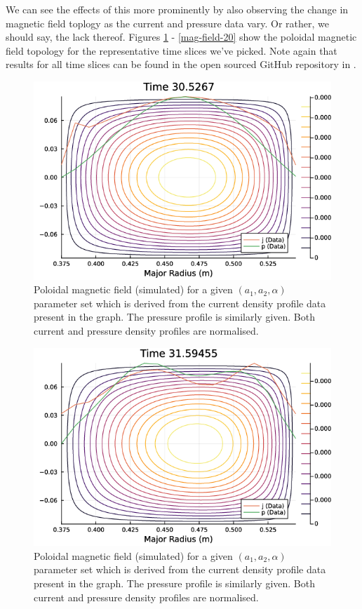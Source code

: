 We can see the effects of this more prominently by also observing the change in magnetic field toplogy 
as the current and pressure data vary. Or rather, we should say, the lack thereof. Figures \ref{mag-field-0} - \ref{mag-field-20}
show the poloidal magnetic field topology for the representative time slices we've picked. Note again that results for all 
time slices can be found in the open sourced GitHub repository in \cite{project-source}.

\begin{figure}[h!]
    \centering
    \includegraphics[scale=0.7]{imgs/c5/magnetic-field-0.png}
    \caption{Poloidal magnetic field (simulated) for a given $(a_1, a_2, \alpha)$ parameter set which is derived 
    from the current density profile data present in the graph. The pressure profile is similarly given. Both current 
    and pressure density profiles are normalised.}
    \label{mag-field-0}
\end{figure}\newpage

\begin{figure}[h!]
    \centering
    \includegraphics[scale=0.55]{imgs/c5/magnetic-field-15.png}
    \caption{Poloidal magnetic field (simulated) for a given $(a_1, a_2, \alpha)$ parameter set which is derived 
    from the current density profile data present in the graph. The pressure profile is similarly given. Both current 
    and pressure density profiles are normalised.}
    \label{mag-field-15}
\end{figure}

